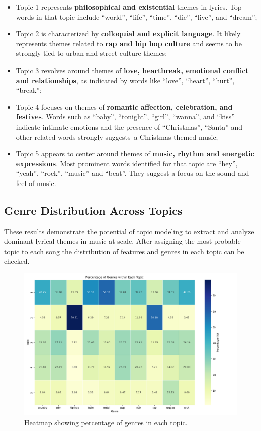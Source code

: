 \begin{itemize}
     \item Topic 1 represents \textbf{philosophical and existential} themes in lyrics.
      Top words in that topic include ``world'', ``life'', ``time'', ``die'',
      ``live'', and ``dream'';
    \item Topic 2 is characterized by \textbf{colloquial and explicit
      language}. It likely represents themes related to \textbf{rap and hip hop culture}
      and seems to be strongly tied to urban and street culture themes;
    \item Topic 3 revolves around themes of \textbf{love, heartbreak, emotional
      conflict and relationships}, as indicated by words like ``love'',
      ``heart'', ``hurt'', ``break'';
    \item Topic 4 focuses on themes of \textbf{romantic affection, celebration,
      and festives}. Words such as ``baby'', ``tonight'', ``girl'', ``wanna'',
      and ``kiss'' indicate intimate emotions and the presence of
      ``Christmas'', ``Santa'' and other related words strongly suggests~a
      Christmas-themed music;
    \item Topic 5 appears to center around themes of \textbf{music, rhythm and
      energetic expressions}. Most prominent words identified for that topic
      are ``hey'', ``yeah'', ``rock'', ``music'' and ``beat''. They suggest a
      focus on the sound and feel of music. 
\end{itemize}


\subsection{Genre Distribution Across Topics}
These results demonstrate the potential of topic modeling to extract and
analyze dominant lyrical themes in music at scale. After assigning the most
probable topic to each song the distribution of features and genres in each
topic can be checked.


\begin{center}
\begin{figure}[H]
  \centering
  \includegraphics[width=6in]{img/lda_genres_distribution.png}
  \caption{Heatmap showing percentage of genres in each topic.}
  \label{Figure:lda_genres_distribution}
\end{figure}
\end{center}

